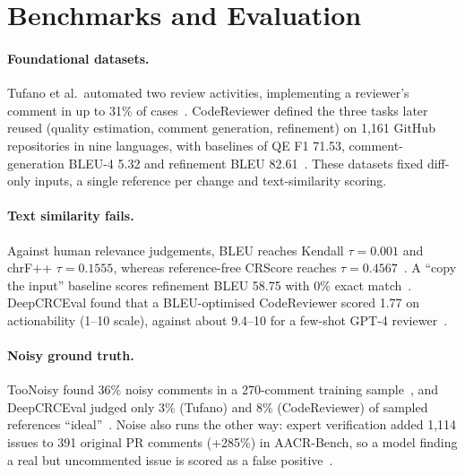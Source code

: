 \section{Benchmarks and Evaluation}\label{sec:benchmarks}

\paragraph{Foundational datasets.} Tufano et al.\ automated two review activities, implementing a reviewer's comment in up to 31\% of cases~\cite{tufano2021towards}. CodeReviewer defined the three tasks later reused (quality estimation, comment generation, refinement) on 1,161 GitHub repositories in nine languages, with baselines of QE F1 71.53, comment-generation BLEU-4 5.32 and refinement BLEU 82.61~\cite{li2022automating}. These datasets fixed diff-only inputs, a single reference per change and text-similarity scoring.

\paragraph{Text similarity fails.} Against human relevance judgements, BLEU reaches Kendall $\tau=0.001$ and chrF++ $\tau=0.1555$, whereas reference-free CRScore reaches $\tau=0.4567$~\cite{naik2025crscore}. A ``copy the input'' baseline scores refinement BLEU 58.75 with 0\% exact match~\cite{li2022automating}. DeepCRCEval found that a BLEU-optimised CodeReviewer scored 1.77 on actionability (1--10 scale), against about 9.4--10 for a few-shot GPT-4 reviewer~\cite{lu2025deepcrceval}.

\paragraph{Noisy ground truth.} TooNoisy found 36\% noisy comments in a 270-comment training sample~\cite{liu2025toonoisy}, and DeepCRCEval judged only 3\% (Tufano) and 8\% (CodeReviewer) of sampled references ``ideal''~\cite{lu2025deepcrceval}. Noise also runs the other way: expert verification added 1,114 issues to 391 original PR comments (+285\%) in AACR-Bench, so a model finding a real but uncommented issue is scored as a false positive~\cite{zhang2026aacr}.

